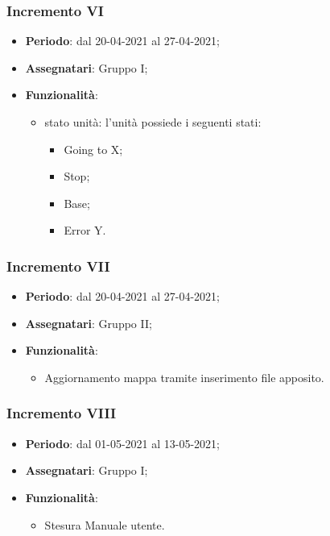 \subsubsection{Incremento VI}
\begin{itemize}
	\item \textbf{Periodo}: dal 20-04-2021 al 27-04-2021;
	\item \textbf{Assegnatari}: Gruppo I;
	\item \textbf{Funzionalità}:
	\begin{itemize}
		\item stato unità: l'unità possiede i seguenti stati:
		\begin{itemize}
			\item Going to X;
			\item Stop;
			\item Base;
			\item Error Y.
		\end{itemize}
	\end{itemize}
\end{itemize}

\subsubsection{Incremento VII}
\begin{itemize}
	\item \textbf{Periodo}: dal 20-04-2021 al 27-04-2021;
	\item \textbf{Assegnatari}: Gruppo II;
	\item \textbf{Funzionalità}:
	\begin{itemize}
		\item Aggiornamento mappa tramite inserimento file apposito.
	\end{itemize}
\end{itemize}

\subsubsection{Incremento VIII}
\begin{itemize}
	\item \textbf{Periodo}: dal 01-05-2021 al 13-05-2021;
	\item \textbf{Assegnatari}: Gruppo I;
	\item \textbf{Funzionalità}:
	\begin{itemize}
		\item Stesura Manuale utente.
	\end{itemize}
\end{itemize}

